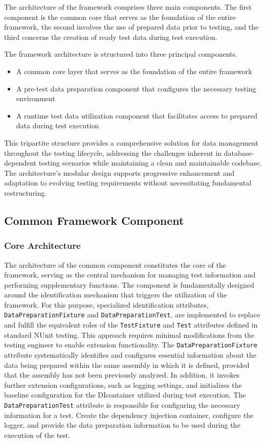 The architecture of the framework comprises three main components. The first component is the common core that serves as the foundation of the entire framework, the second involves the use of prepared data prior to testing, and the third concerns the creation of ready test data during test execution.

The framework architecture is structured into three principal components.
\begin{itemize}
    \item A common core layer that serves as the foundation of the entire framework
    \item A pre-test data preparation component that configures the necessary testing environment
    \item A runtime test data utilization component that facilitates access to prepared data during test execution
\end{itemize}


This tripartite structure provides a comprehensive solution for data management throughout the testing lifecycle, addressing the challenges inherent in database-dependent testing scenarios while maintaining a clean and maintainable codebase. The architecture's modular design supports progressive enhancement and adaptation to evolving testing requirements without necessitating fundamental restructuring.

\subsection{Common Framework Component}
\subsubsection{Core Architecture}
The architecture of the common component constitutes the core of the framework, serving as the central mechanism for managing test information and performing supplementary functions. The component is fundamentally designed around the identification mechanism that triggers the utilization of the framework. For this purpose, specialized identification attributes, \texttt{DataPreparationFixture} and \texttt{DataPreparationTest}, are implemented to replace and fulfill the equivalent roles of the \texttt{TestFixture} and \texttt{Test} attributes defined in standard NUnit testing. This approach requires minimal modifications from the testing engineer to enable extension functionality. The \texttt{DataPreparationFixture} attribute systematically identifies and configures essential information about the data being prepared within the same assembly in which it is defined, provided that the assembly has not been previously analyzed. In addition, it invokes further extension configurations, such as logging settings, and initializes the baseline configuration for the \ac{DI}container utilized during test execution. The \texttt{DataPreparationTest} attribute is responsible for configuring the necessary information for a test. Create the dependency injection container, configure the logger, and provide the data preparation information to be used during the execution of the test.

